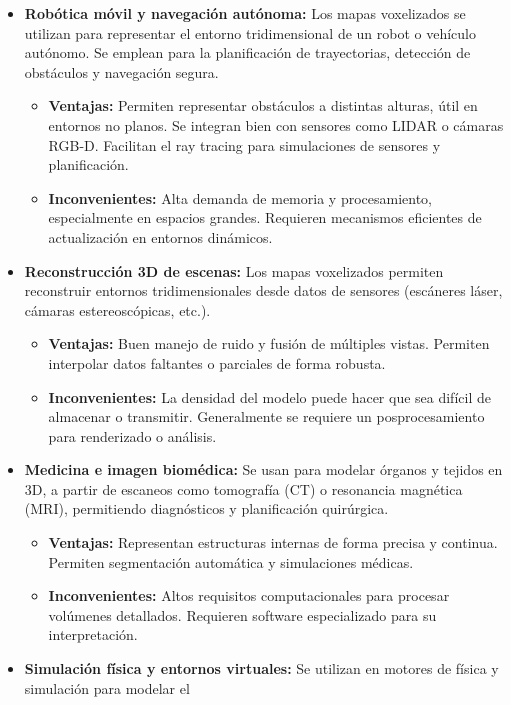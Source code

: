 \documentclass[12pt, a4paper, twoside]{article}
\begin{document}
\begin{itemize}
  \item \textbf{Robótica móvil y navegación autónoma:} Los mapas voxelizados se utilizan para representar el entorno tridimensional 
  de un robot o vehículo autónomo. Se emplean para la planificación de trayectorias, detección de obstáculos y navegación segura.
  \begin{itemize}
    \item \textbf{Ventajas:} Permiten representar obstáculos a distintas alturas, útil en entornos no planos. Se integran bien con 
    sensores como LIDAR o cámaras RGB-D. Facilitan el ray tracing para simulaciones de sensores y planificación.
    \item \textbf{Inconvenientes:} Alta demanda de memoria y procesamiento, especialmente en espacios grandes. Requieren mecanismos 
    eficientes de actualización en entornos dinámicos.
  \end{itemize}
  \item \textbf{Reconstrucción 3D de escenas:} Los mapas voxelizados permiten reconstruir entornos tridimensionales desde datos de 
  sensores (escáneres láser, cámaras estereoscópicas, etc.).
  \begin{itemize}
    \item \textbf{Ventajas:} Buen manejo de ruido y fusión de múltiples vistas. Permiten interpolar datos faltantes o parciales 
    de forma robusta.
    \item \textbf{Inconvenientes:} La densidad del modelo puede hacer que sea difícil de almacenar o transmitir. Generalmente 
    se requiere un posprocesamiento para renderizado o análisis.
  \end{itemize}
  \item \textbf{Medicina e imagen biomédica:} Se usan para modelar órganos y tejidos en 3D, a partir de escaneos como tomografía 
  (CT) o resonancia magnética (MRI), permitiendo diagnósticos y planificación quirúrgica.
  \begin{itemize}
    \item \textbf{Ventajas:} Representan estructuras internas de forma precisa y continua. Permiten segmentación automática 
    y simulaciones médicas.
    \item \textbf{Inconvenientes:} Altos requisitos computacionales para procesar volúmenes detallados. Requieren software 
    especializado para su interpretación.
  \end{itemize}
  \item \textbf{Simulación física y entornos virtuales:} Se utilizan en motores de física y simulación para modelar el 

\end{itemize}
\end{document}
